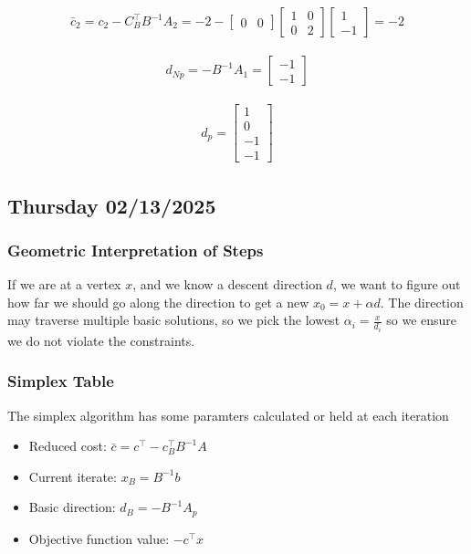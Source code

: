 \begin{align}
    \bar{c}_2 = c_2 - C_B^\top B^{-1} A_2 =
    -2 -
  \begin{bmatrix}
     0 & 0
  \end{bmatrix}
  \begin{bmatrix}
    1 & 0 \\ 0 & 2
  \end{bmatrix}
  \begin{bmatrix}
    1 \\ -1
  \end{bmatrix}
  = -2
\end{align}

\begin{align}
    d_{Np} = -B^{-1} A_1 = 
    \begin{bmatrix}
        -1 \\ -1
    \end{bmatrix}
\end{align}

\begin{align}
    d_p = 
    \begin{bmatrix}
        1 \\ 0 \\ -1 \\ -1
    \end{bmatrix}
\end{align}

\subsection{Thursday 02/13/2025}

\subsubsection{Geometric Interpretation of Steps}
If we are at a vertex $x$, and we know a descent direction $d$, we want to figure out how far we should go along the direction to get a new $x_0 = x + \alpha d $.
The direction may traverse multiple basic solutions, so we pick the lowest $\alpha_i = \frac{x}{d_i}$ so we ensure we do not violate the constraints.


\subsubsection{Simplex Table}
The simplex algorithm has some paramters calculated or held at each iteration
\begin{itemize}
  \item Reduced cost: $\bar{c} = c^\top - c_B^\top B^{-1} A$
  \item Current iterate: $x_B = B^{-1} b$
  \item Basic direction: $d_B = -B^{-1} A_p$
  \item Objective function value: $-c^\top x$
\end{itemize}

